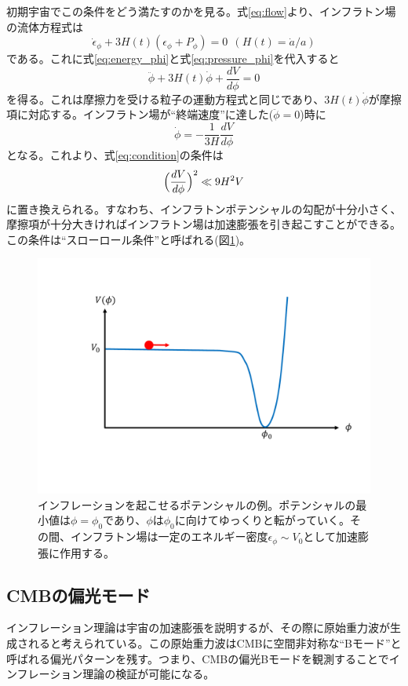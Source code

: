 初期宇宙でこの条件をどう満たすのかを見る。式\eqref{eq:flow}より、インフラトン場の流体方程式は
\begin{equation}
  \dot\epsilon_{\phi} + 3H(t)(\epsilon_{\phi} + P_{\phi}) = 0  ~~ (H(t) = \dot{a}/a)
\end{equation}
である。これに式\eqref{eq:energy_phi}と式\eqref{eq:pressure_phi}を代入すると
\begin{equation}
  \ddot\phi + 3H(t)\dot\phi + \frac{dV}{d\phi} = 0
\end{equation}
を得る。これは摩擦力を受ける粒子の運動方程式と同じであり、$3H(t)\dot\phi$が摩擦項に対応する。インフラトン場が``終端速度''に達した($\ddot\phi = 0$)時に
\begin{equation}
  \dot\phi = -\frac{1}{3H}\frac{dV}{d\phi}
\end{equation}
となる。これより、式\eqref{eq:condition}の条件は
\begin{equation}
  \Bigl(\frac{dV}{d\phi}\Bigr)^{2} \ll 9H^{2}V
\end{equation}
に置き換えられる。すなわち、インフラトンポテンシャルの勾配が十分小さく、摩擦項が十分大きければインフラトン場は加速膨張を引き起こすことができる。この条件は``スローロール条件''と呼ばれる(図\ref{slow_roll})。
\begin{figure}[htbp]
  \centering
  \includegraphics[width=0.8\columnwidth]{2_cosmology/figs/slow_roll.pdf}
  \caption{インフレーションを起こせるポテンシャルの例。ポテンシャルの最小値は$\phi = \phi_{0}$であり、$\phi$は$\phi_{0}$に向けてゆっくりと転がっていく。その間、インフラトン場は一定のエネルギー密度$\epsilon_{\phi}\sim V_{0}$として加速膨張に作用する。}
  \label{slow_roll}
\end{figure}

\subsection{CMBの偏光モード}
インフレーション理論は宇宙の加速膨張を説明するが、その際に原始重力波が生成されると考えられている\cite{primordial}。この原始重力波はCMBに空間非対称な``Bモード''と呼ばれる偏光パターンを残す。つまり、CMBの偏光Bモードを観測することでインフレーション理論の検証が可能になる。

